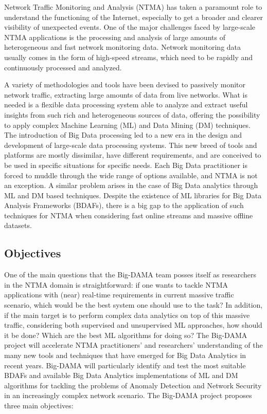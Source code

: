 \documentclass[10pt, conference, letterpaper]{IEEEtran}
\begin{document}
Network Traffic Monitoring and Analysis (NTMA) has taken a paramount role to understand the functioning of the Internet, especially to get a broader and clearer visibility of unexpected events. One of the major challenges faced by large-scale NTMA applications is the processing and analysis of large amounts of heterogeneous and fast network monitoring data. Network monitoring data usually comes in the form of high-speed streams, which need to be rapidly and continuously processed and analyzed.

A variety of methodologies and tools have been devised to passively monitor network traffic, extracting large amounts of data from live networks. What is needed is a flexible data processing system able to analyze and extract useful insights from such rich and heterogeneous sources of data, offering the possibility to apply complex Machine Learning (ML) and Data Mining (DM) techniques. The introduction of Big Data processing led to a new era in the design and development of large-scale data processing systems. This new breed of tools and platforms are mostly dissimilar, have different requirements, and are conceived to be used in specific situations for specific needs. Each Big Data practitioner is forced to muddle through the wide range of options available, and NTMA is not an exception. A similar problem arises in the case of Big Data analytics through ML and DM based techniques. Despite the existence of ML libraries for Big Data Analysis Frameworks (BDAFs), there is a big gap to the application of such techniques for NTMA when considering fast online streams and massive offline datasets.

\subsection{Objectives}

One of the main questions that the Big-DAMA team posses itself as researchers in the NTMA domain is straightforward: if one wants to tackle NTMA applications with (near) real-time requirements in current massive traffic scenario, which would be the best system one should use to the task? In addition, if the main target is to perform complex data analytics on top of this massive traffic, considering both supervised and unsupervised ML approaches, how should it be done? Which are the best ML algorithms for doing so? The Big-DAMA project will accelerate NTMA practitioners' and researchers' understanding of the many new tools and techniques that have emerged for Big Data Analytics in recent years. Big-DAMA will particularly identify and test the most suitable BDAFs and available Big Data Analytics implementations of ML and DM algorithms for tackling the problems of Anomaly Detection and Network Security in an increasingly complex network scenario. The Big-DAMA project proposes three main objectives:
\end{document}
